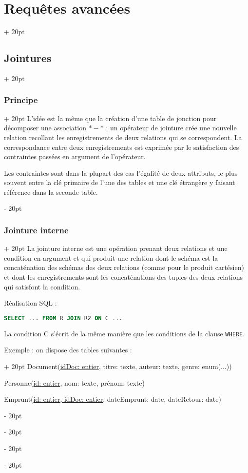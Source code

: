 \documentclass[a4paper, 12pt, twoside]{article}
\newcommand{\ind}[1][20pt]{\advance\leftskip + #1}
\newcommand{\deind}[1][20pt]{\advance\leftskip - #1}
\newenvironment{indt}[2][20pt]{#2 \par \ind[#1]}{\par \deind} %
\begin{document}
\begin{indt}{\section{Requêtes avancées}}
\begin{indt}{\subsection{Jointures}}
\begin{indt}{\subsubsection{Principe}}
                L'idée est la même que la création d'une table de jonction pour décomposer une association $*-*$ : un opérateur de jointure crée une nouvelle relation recollant les enregistrements de deux relations qui se correspondent. La correspondance entre deux enregistrements est exprimée par le satisfaction des contraintes passées en argument de l'opérateur.

                Les contraintes sont dans la plupart des cas l'égalité de deux attributs, le plus souvent entre la clé primaire de l'une des tables et une clé étrangère y faisant référence dans la seconde table.
            \end{indt}

            \vspace{12pt}
            
            \begin{indt}{\subsubsection{Jointure interne}}
                La jointure interne est une opération prenant deux relations et une condition en argument et qui produit une relation dont le schéma est la concaténation des schémas des deux relations (comme pour le produit cartésien) et dont les enregistrements sont les concaténations des tuples des deux relations qui satisfont la condition.

                Réalisation SQL :

                \begin{lstlisting}[language=SQL, xleftmargin=80pt]
SELECT ... FROM R JOIN R2 ON C ...\end{lstlisting}

                \vspace{12pt}
                
                La condition C s'écrit de la même manière que les conditions de la clause \texttt{WHERE}.

                \vspace{6pt}
                
                \begin{indt}{Exemple : on dispose des tables suivantes :
}
                    Document(\underline{idDoc: entier}, titre: texte, auteur: texte, genre: enum(...))

                    Personne(\underline{id: entier}, nom: texte, prénom: texte)

                    Emprunt(\underline{id: entier, idDoc: entier}, dateEmprunt: date, dateRetour: date)
                \end{indt}


\end{indt}
\end{indt}
\end{indt}
\end{document}
